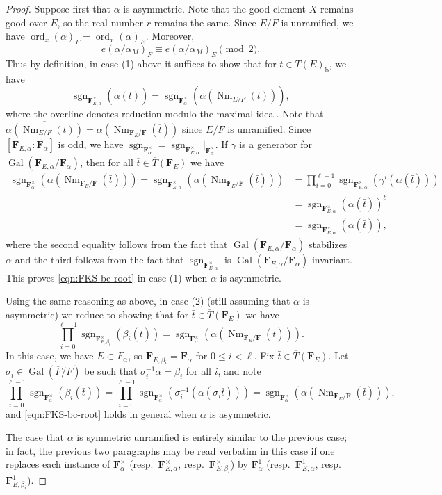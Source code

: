 \documentclass[reqno]{amsart}
\numberwithin{equation}{subsection}
\newcommand{\F}{\mathbf{F}}
\newcommand{\sgn}{\operatorname{sgn}}
\newcommand{\Gal}{\operatorname{Gal}}
\newcommand{\ol}[1]{\overline{#1}}
\newcommand{\co}{\colon}
\DeclareMathOperator{\ord}{ord}
\DeclareMathOperator{\Nm}{Nm}
\theoremstyle{remark}
\numberwithin{equation}{subsection}
\numberwithin{figure}{subsection}
\begin{document}
\begin{proof}
Suppose first that $\alpha$ is asymmetric. Note that the good element $X$ remains good over $E$, so the real number $r$ remains the same. Since $E/F$ is unramified, we have $\ord_x(\alpha)_F = \ord_x(\alpha)_E$. Moreover,
\[
e(\alpha/\alpha_M)_F \equiv e(\alpha/\alpha_M)_E \pmod{2}.
\]
Thus by definition, in case (1) above it suffices to show that for $t \in T(E)_{\mathrm{b}}$, we have
\[
\sgn_{\F_{E,\alpha}^\times}(\ol{\alpha(t)}) = \sgn_{\F_\alpha^\times}(\ol{\alpha(\Nm_{E/F}(t))}),
\]
where the overline denotes reduction modulo the maximal ideal. Note that $\ol{\alpha(\Nm_{E/F}(t))} = \alpha(\Nm_{\F_E/\F}(\ol t))$ since $E/F$ is unramified. Since $[\F_{E,\alpha}\co \F_\alpha]$ is odd, we have $\sgn_{\F_\alpha^\times} = \sgn_{\F_{E,\alpha}^\times}|_{\F_\alpha^\times}$. If $\gamma$ is a generator for $\Gal(\F_{E,\alpha}/\F_\alpha)$, then for all $\ol t \in \ol T(\F_E)$ we have
\begin{align*}
\sgn_{\F_\alpha^\times}(\alpha(\Nm_{\F_E/\F}(\bar t))) = \sgn_{\F_{E,\alpha}^\times}(\alpha(\Nm_{\F_E/\F}(\bar t))) &= \prod_{i=0}^{\ell-1} \sgn_{\F_{E,\alpha}^\times}(\gamma^i(\alpha(\bar t)))\\
    &= \sgn_{\F_{E,\alpha}^\times}(\alpha(\bar t))^\ell\\
    &= \sgn_{\F_{E,\alpha}^\times}(\alpha(\bar t)),
\end{align*}
where the second equality follows from the fact that $\Gal(\F_{E,\alpha}/\F_\alpha)$ stabilizes $\alpha$ and the third follows from the fact that $\sgn_{\F_{E,\alpha}^\times}$ is $\Gal(\F_{E,\alpha}/\F_\alpha)$-invariant. This proves \eqref{eqn:FKS-bc-root} in case (1) when $\alpha$ is asymmetric.

Using the same reasoning as above, in case (2) (still assuming that $\alpha$ is asymmetric) we reduce to showing that for $\bar t \in \ol T(\F_E)$ we have
\[
\prod_{i=0}^{\ell-1} \sgn_{\F_{E,\beta_i}^\times}(\beta_i(\bar t)) = \sgn_{\F_\alpha^\times}(\alpha(\Nm_{\F_E/\F}(\bar t))).
\]
In this case, we have $E \subset F_\alpha$, so $\F_{E,\beta_i} = \F_\alpha$ for $0 \leq i < \ell$. Fix $\bar t \in \ol T(\F_E)$. Let $\sigma_i \in \Gal(\ol F/F)$ be such that $\sigma_i^{-1}\alpha = \beta_i$ for all $i$, and note
\[
\prod_{i=0}^{\ell-1} \sgn_{\F_\alpha^\times}(\beta_i(\bar t)) = \prod_{i=0}^{\ell-1} \sgn_{\F_\alpha^\times}(\sigma_i^{-1}(\alpha(\sigma_i\bar t))) = \sgn_{\F_\alpha^\times}(\alpha(\Nm_{\F_E/\F}(\bar t))),
\]
and \eqref{eqn:FKS-bc-root} holds in general when $\alpha$ is asymmetric.

The case that $\alpha$ is symmetric unramified is entirely similar to the previous case; in fact, the previous two paragraphs may be read verbatim in this case if one replaces each instance of $\F_\alpha^\times$ (resp.\ $\F_{E,\alpha}^\times$, resp.\ $\F_{E,\beta_i}^\times$) by $\F_\alpha^1$ (resp.\ $\F_{E,\alpha}^1$, resp.\ $\F_{E,\beta_i}^1$).



\end{proof}
\end{document}
